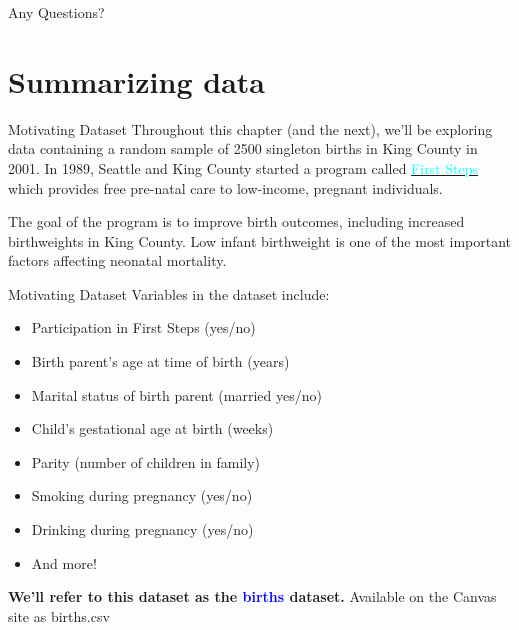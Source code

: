 \documentclass[10pt,t]{beamer}
\begin{document}
\begin{frame}[c]
\centering \huge Any Questions?
\end{frame}

\section{Summarizing data}


\begin{frame}{Motivating Dataset}
Throughout this chapter (and the next), we'll be exploring data containing a random sample of 2500 singleton births in King County in 2001. In 1989, Seattle and King County started a program called \href{https://kingcounty.gov/depts/health/child-teen-health/maternity-support-infant-case-management.aspx}{\textcolor{cyan}{First Steps}} which provides free pre-natal care to low-income, pregnant individuals. 

\vspace{0.3cm}

The goal of the program is to improve birth outcomes, including increased birthweights in King County. Low infant birthweight is one of the most important factors affecting neonatal mortality. 

\end{frame}

\begin{frame}{Motivating Dataset}
Variables in the dataset include:

\vspace{0.3cm}


\begin{itemize}
	\item Participation in First Steps (yes/no)
	\item Birth parent's age at time of birth (years)
	\item Marital status of birth parent (married yes/no)
	\item Child's gestational age at birth (weeks)
	\item Parity (number of children in family)
	\item Smoking during pregnancy (yes/no)
	\item Drinking during pregnancy (yes/no)
	\item And more!
\end{itemize}

\vspace{0.3cm} 

\textbf{We'll refer to this dataset as the \textcolor{blue}{births} dataset.} Available on the Canvas site as \color{blue} births.csv
\end{frame}
\end{document}
